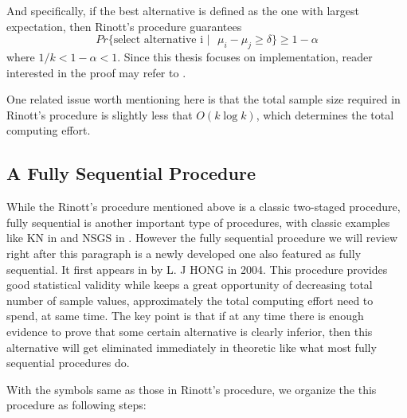 \documentclass[12pt,a4paper]{report}
\begin{document}
And specifically, if the best alternative is defined as the one with largest expectation, then Rinott's procedure guarantees
$$ Pr\{\text{select alternative i }|\text{ }\mu_i - \mu_j \geqslant \delta \} \geqslant 1 - \alpha $$
where $1/k < 1 - \alpha < 1$. Since this thesis focuses on implementation, reader interested in the proof may refer to \cite{ras-recent-advances}. 

One related issue worth mentioning here is that the total sample size required in Rinott's procedure is slightly less that $O(k\log{k})$, which determines the total computing effort.

\subsection{A Fully Sequential Procedure}

While the Rinott's procedure mentioned above is a classic two-staged procedure, fully sequential is another important type of procedures, with classic examples like KN in \cite{tomacs01kn} and NSGS in \cite{or01nsgs}. However the fully sequential procedure we will review right after this paragraph is a newly developed one also featured as fully sequential. It first appears in \cite{ras-seq-jeff} by L. J HONG in 2004. This procedure provides good statistical validity while keeps a great opportunity of decreasing total number of sample values, approximately the total computing effort need to spend, at same time. The key point is that if at any time there is enough evidence to prove that some certain alternative is clearly inferior, then this alternative will get eliminated immediately in theoretic like what most fully sequential procedures do.

With the symbols same as those in Rinott's procedure, we organize the this procedure as following steps:
\end{document}
